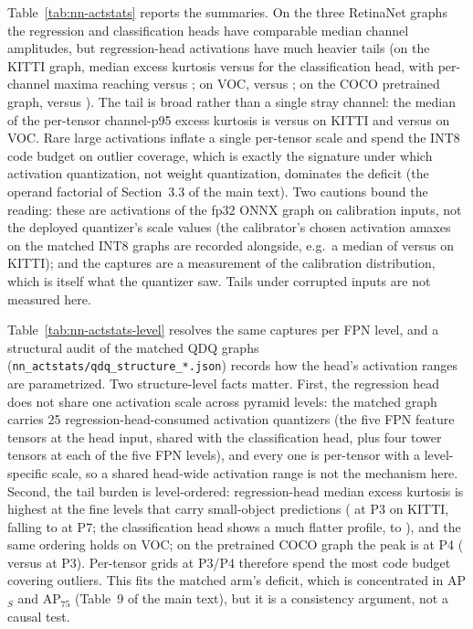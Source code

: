 \documentclass[10pt]{article}
\begin{document}
Table~\ref{tab:nn-actstats} reports the summaries. On the three RetinaNet
graphs the regression and classification heads have comparable median channel
amplitudes, but regression-head activations have much heavier tails (on the KITTI graph, median excess kurtosis
\nnActRegKurtMedKitti{} versus \nnActClsKurtMedKitti{} for the
classification head, with per-channel maxima reaching
\nnActRegKurtMaxKitti{} versus \nnActClsKurtMaxKitti; on VOC,
\nnActRegKurtMedVoc{} versus \nnActClsKurtMedVoc; on the COCO pretrained
graph, \nnActRegKurtMedCoco{} versus \nnActClsKurtMedCoco). The tail is
broad
rather than a single stray channel: the median of the per-tensor
channel-p95 excess kurtosis is \nnActRegKurtTailKitti{} versus
\nnActClsKurtTailKitti{} on KITTI and \nnActRegKurtTailVoc{} versus
\nnActClsKurtTailVoc{} on VOC. Rare large
activations inflate a single per-tensor scale and spend the INT8 code
budget on outlier coverage, which is exactly the signature under which
activation quantization, not weight quantization, dominates the deficit
(the operand factorial of Section~3.3 of the main text). Two cautions bound the
reading: these are activations of the fp32 ONNX graph on calibration
inputs, not the deployed quantizer's scale values (the calibrator's chosen
activation amaxes on the matched INT8 graphs are recorded alongside, e.g.\
a median of \nnActStaticRegMedKitti{} versus \nnActStaticClsMedKitti{} on
KITTI); and the captures are
a measurement of the calibration distribution, which is itself what the
quantizer saw. Tails under corrupted inputs are not measured here.

Table~\ref{tab:nn-actstats-level} resolves the same captures per FPN level,
and a structural audit of the matched QDQ graphs
(\texttt{nn\_actstats/qdq\_structure\_*.json}) records how the head's
activation ranges are parametrized. Two structure-level facts matter. First,
the regression head does not share one activation scale across pyramid
levels: the matched graph carries 25 regression-head-consumed activation
quantizers (the five FPN feature tensors at the head input, shared
with the classification head, plus four tower tensors at each of the five FPN levels), and every one is per-tensor with a
level-specific scale, so a shared head-wide activation range is not the
mechanism here. Second, the tail burden is level-ordered: regression-head
median excess kurtosis is highest at the fine levels that carry
small-object predictions (\nnActRegKurtPThreeKitti{} at P3 on KITTI,
falling to \nnActRegKurtPSevenKitti{} at P7; the classification head shows a
much flatter profile, \nnActClsKurtPThreeKitti{} to
\nnActClsKurtPSevenKitti), and the same ordering holds on VOC; on the pretrained COCO graph the peak is
at P4 (\nnActRegKurtPFourCoco{} versus \nnActRegKurtPThreeCoco{} at P3). Per-tensor grids at P3/P4 therefore spend the most
code budget covering outliers. This fits the matched arm's
deficit, which is concentrated in AP$_S$ and AP$_{75}$ (Table~9 of the
main text), but it is a consistency argument, not a causal test.
\end{document}
